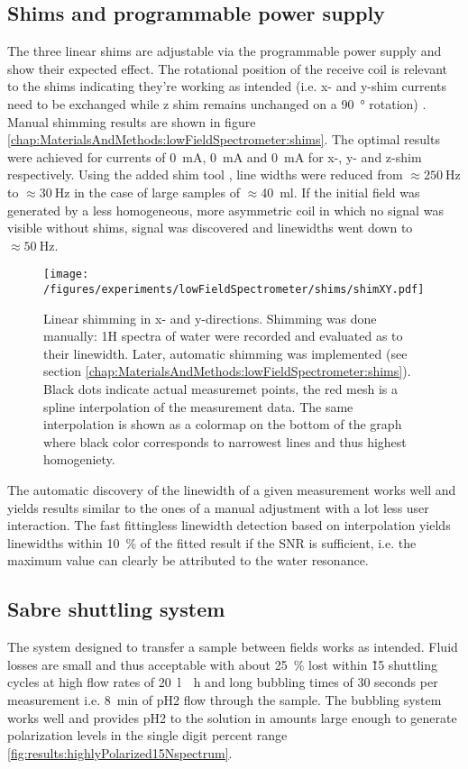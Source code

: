     \subsection{Shims and programmable power supply}
        The three linear shims are adjustable via the programmable power supply and show their expected effect. The rotational position of the receive coil is relevant to the shims indicating they're working as intended (i.e. x- and y-shim currents need to be exchanged while z shim remains unchanged on a \SI{90}{\degree} rotation) . Manual shimming results are shown in figure \ref{chap:MaterialsAndMethods:lowFieldSpectrometer:shims}. The optimal results were achieved for currents of \SI{0}{\milli\ampere},  \SI{0}{\milli\ampere} and \SI{0}{\milli\ampere} for x-, y- and z-shim respectively. Using the added shim tool , line widths were reduced from $\approx \SI{250}{\hertz}$ to $\approx \SI{30}{\hertz}$ in the case of large samples of $\approx $\SI{40}{\milli\litre}. If the initial field was generated by a less homogeneous, more asymmetric coil in which no signal was visible without shims, signal was discovered and linewidths went down to $\approx \SI{50}{\hertz}$.
        \begin{figure}
            \label{fig:results:lowFieldSpectrometer:shims}
            \texttt{[image: /figures/experiments/lowFieldSpectrometer/shims/shimXY.pdf]}
            \caption[Manual low field shimming]{Linear shimming in x- and y-directions. Shimming was done manually: 1H spectra of water were recorded and evaluated as to their linewidth. Later, automatic shimming was implemented (see section \ref{chap:MaterialsAndMethods:lowFieldSpectrometer:shims}). Black dots indicate actual measuremet points, the red mesh is a spline interpolation of the measurement data. The same interpolation is shown as a colormap on the bottom of the graph where black color corresponds to narrowest lines and thus highest homogeniety.}
        \end{figure}
        The automatic discovery of the linewidth of a given measurement works well and yields results similar to the ones of a manual adjustment with a lot less user interaction. The fast fittingless linewidth detection based on interpolation yields linewidths within \SI{10}{\percent} of the fitted result if the SNR is sufficient, i.e. the maximum value can clearly be attributed to the water resonance.
    \subsection{Sabre shuttling system}
        The system designed to transfer a sample between fields works as intended. Fluid losses are small and thus
        acceptable with about \SI{25}{\percent} lost within \~15 shuttling cycles at high flow rates of \SI{20}{\litre
        \per\hour} and long bubbling times of 30 seconds per measurement i.e. \SI{8}{\minute} of pH2 flow through the
        sample. The bubbling system works well and provides pH2 to the solution in amounts large enough to generate
        polarization levels in the single digit percent range \ref{fig:results:highlyPolarized15Nspectrum}.
